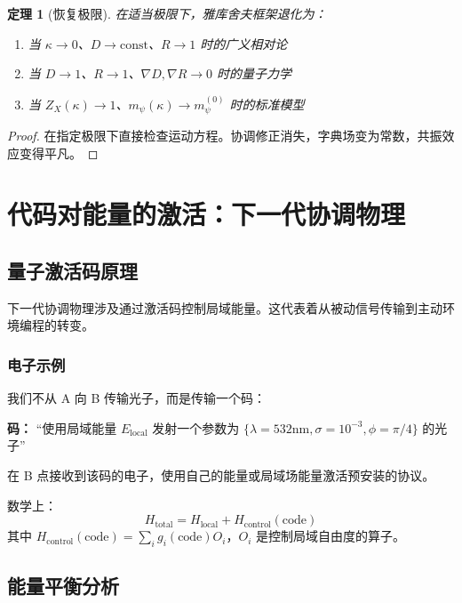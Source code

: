\documentclass[11pt,a4paper]{article}
\newtheorem{theorem}{定理}
\begin{document}
	\begin{theorem}[恢复极限]
		在适当极限下，雅库舍夫框架退化为：
		\begin{enumerate}
			\item 当 $\kappa \to 0$、$D \to \text{const}$、$R \to 1$ 时的广义相对论
			\item 当 $D \to 1$、$R \to 1$、$\nabla D, \nabla R \to 0$ 时的量子力学
			\item 当 $Z_X(\kappa) \to 1$、$m_\psi(\kappa) \to m_\psi^{(0)}$ 时的标准模型
		\end{enumerate}
	\end{theorem}
	
	\begin{proof}
		在指定极限下直接检查运动方程。协调修正消失，字典场变为常数，共振效应变得平凡。
	\end{proof}
	
	\section{代码对能量的激活：下一代协调物理}
	\label{sec:energy-activation}
	
	\subsection{量子激活码原理}
	
	下一代协调物理涉及通过激活码控制局域能量。这代表着从被动信号传输到主动环境编程的转变。
	
	\subsubsection{电子示例}
	我们不从 A 向 B 传输光子，而是传输一个码：
	
	\textbf{码：} “使用局域能量 $E_{\text{local}}$ 发射一个参数为 $\{\lambda=532\text{nm}, \sigma=10^{-3}, \phi=\pi/4\}$ 的光子”
	
	在 B 点接收到该码的电子，使用自己的能量或局域场能量激活预安装的协议。
	
	数学上：
	\begin{equation}
		H_{\text{total}} = H_{\text{local}} + H_{\text{control}}(\text{code})
	\end{equation}
	其中 $H_{\text{control}}(\text{code}) = \sum_i g_i(\text{code}) O_i$，$O_i$ 是控制局域自由度的算子。
	
	\subsection{能量平衡分析}
	
\end{document}
